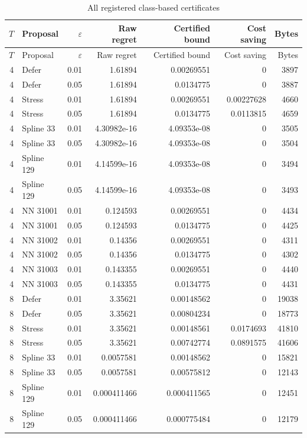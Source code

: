 \begin{longtable}{rlrrrrr}\caption{All registered class-based certificates}\label{tab:all}\\
\toprule $T$ & Proposal & $\varepsilon$ & Raw regret & Certified bound & Cost saving & Bytes \\\midrule\endfirsthead
\toprule $T$ & Proposal & $\varepsilon$ & Raw regret & Certified bound & Cost saving & Bytes \\\midrule\endhead
4 & Defer & 0.01 & 1.61894 & 0.00269551 & 0 & 3897 \\
4 & Defer & 0.05 & 1.61894 & 0.0134775 & 0 & 3887 \\
4 & Stress & 0.01 & 1.61894 & 0.00269551 & 0.00227628 & 4660 \\
4 & Stress & 0.05 & 1.61894 & 0.0134775 & 0.0113815 & 4659 \\
4 & Spline 33 & 0.01 & 4.30982e-16 & 4.09353e-08 & 0 & 3505 \\
4 & Spline 33 & 0.05 & 4.30982e-16 & 4.09353e-08 & 0 & 3504 \\
4 & Spline 129 & 0.01 & 4.14599e-16 & 4.09353e-08 & 0 & 3494 \\
4 & Spline 129 & 0.05 & 4.14599e-16 & 4.09353e-08 & 0 & 3493 \\
4 & NN 31001 & 0.01 & 0.124593 & 0.00269551 & 0 & 4434 \\
4 & NN 31001 & 0.05 & 0.124593 & 0.0134775 & 0 & 4425 \\
4 & NN 31002 & 0.01 & 0.14356 & 0.00269551 & 0 & 4311 \\
4 & NN 31002 & 0.05 & 0.14356 & 0.0134775 & 0 & 4302 \\
4 & NN 31003 & 0.01 & 0.143355 & 0.00269551 & 0 & 4440 \\
4 & NN 31003 & 0.05 & 0.143355 & 0.0134775 & 0 & 4431 \\
8 & Defer & 0.01 & 3.35621 & 0.00148562 & 0 & 19038 \\
8 & Defer & 0.05 & 3.35621 & 0.00804234 & 0 & 18773 \\
8 & Stress & 0.01 & 3.35621 & 0.00148561 & 0.0174693 & 41810 \\
8 & Stress & 0.05 & 3.35621 & 0.00742774 & 0.0891575 & 41606 \\
8 & Spline 33 & 0.01 & 0.0057581 & 0.00148562 & 0 & 15821 \\
8 & Spline 33 & 0.05 & 0.0057581 & 0.00575812 & 0 & 12143 \\
8 & Spline 129 & 0.01 & 0.000411466 & 0.000411565 & 0 & 12451 \\
8 & Spline 129 & 0.05 & 0.000411466 & 0.000775484 & 0 & 12179 \\

\end{longtable}
